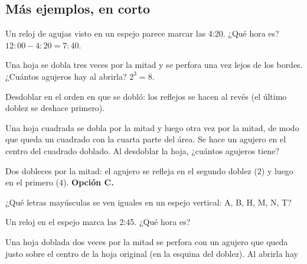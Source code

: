 \subsection{Más ejemplos, en corto}
\begin{ejemplo}
Un reloj de agujas visto en un espejo parece marcar las 4:20. ¿Qué hora es?
\solucion $12{:}00 - 4{:}20 = 7{:}40$.
\end{ejemplo}

\begin{ejemplo}
Una hoja se dobla tres veces por la mitad y se perfora una vez lejos de los bordes. ¿Cuántos agujeros hay al abrirla?
\solucion $2^3 = 8$.
\end{ejemplo}

\begin{trampa}
Desdoblar en el orden en que se dobló: los reflejos se hacen al revés (el último doblez se deshace primero).
\end{trampa}

\begin{reto}
Una hoja cuadrada se dobla por la mitad y luego otra vez por la mitad, de modo que queda un cuadrado con la cuarta parte
del área. Se hace un agujero en el centro del cuadrado doblado. Al desdoblar la hoja, ¿cuántos agujeros tiene?
\end{reto}

\begin{retoresuelto}
Dos dobleces por la mitad: el agujero se refleja en el segundo doblez (2) y luego en el primero (4). \textbf{Opción C.}
\end{retoresuelto}

\taller
{}
\begin{ejercicios}
\item ¿Qué letras mayúsculas se ven iguales en un espejo vertical: A, B, H, M, N, T? 
\item Un reloj en el espejo marca las 2:45. ¿Qué hora es? 
\end{ejercicios}
\begin{ejercicios}
\item Una hoja doblada dos veces por la mitad se perfora con un agujero que queda justo sobre el centro de la hoja original (en la esquina del doblez). Al abrirla hay
\end{ejercicios}

